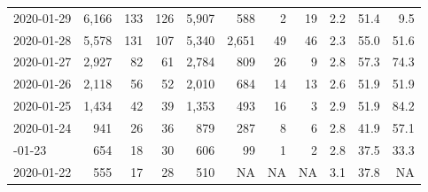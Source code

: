 \documentclass[12pt, a4paper,oneside]{book}
\theoremstyle{definition}
\begin{document}
\begin{longtable}{lrrrrrrrrrr}
	2020-01-29 & 6,166 & 133 & 126 & 5,907 & 588 & 2 & 19 & 2.2 & 51.4 & 9.5\\
	\addlinespace
	\rowcolor{gray!6}  2020-01-28 & 5,578 & 131 & 107 & 5,340 & 2,651 & 49 & 46 & 2.3 & 55.0 & 51.6\\
	2020-01-27 & 2,927 & 82 & 61 & 2,784 & 809 & 26 & 9 & 2.8 & 57.3 & 74.3\\
	\rowcolor{gray!6}  2020-01-26 & 2,118 & 56 & 52 & 2,010 & 684 & 14 & 13 & 2.6 & 51.9 & 51.9\\
	2020-01-25 & 1,434 & 42 & 39 & 1,353 & 493 & 16 & 3 & 2.9 & 51.9 & 84.2\\
	\rowcolor{gray!6}  2020-01-24 & 941 & 26 & 36 & 879 & 287 & 8 & 6 & 2.8 & 41.9 & 57.1\\
	\addlinespace
	2020-01-23 & 654 & 18 & 30 & 606 & 99 & 1 & 2 & 2.8 & 37.5 & 33.3\\
	\rowcolor{gray!6}  2020-01-22 & 555 & 17 & 28 & 510 & NA & NA & NA & 3.1 & 37.8 & NA\\*
	\bottomrule
\end{longtable}
\endgroup{} 
\end{document}
